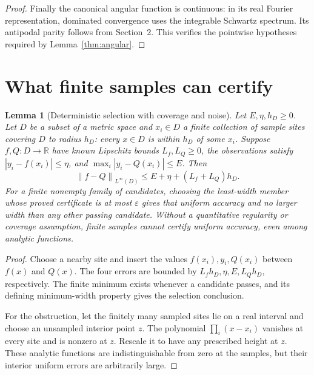 \documentclass[11pt,letterpaper]{article}
\newcommand{\R}{\mathbb R}
\newcommand{\eps}{\varepsilon}
\newcommand{\norm}[1]{\left\lVert#1\right\rVert}
\newtheorem{lemma}{Lemma}[section]
\theoremstyle{definition}
\theoremstyle{remark}
\begin{document}
\begin{proof}
Finally the canonical angular function is continuous: in its real Fourier
representation, dominated convergence uses the integrable Schwartz spectrum.
Its antipodal parity follows from Section~2. This verifies the pointwise
hypotheses required by Lemma~\ref{thm:angular}.
\end{proof}

\section{What finite samples can certify}
\begin{lemma}[Deterministic selection with coverage and noise]\label{thm:data}
Let \(E,\eta,h_D\ge0\). Let \(D\) be a subset of a metric space and
\(x_i\in D\) a finite collection of sample sites covering
\(D\) to radius \(h_D\): every \(x\in D\) is within \(h_D\) of some \(x_i\).
Suppose \(f,Q:D\to\R\) have known Lipschitz bounds \(L_f,L_Q\ge0\),
the observations satisfy \(|y_i-f(x_i)|\le\eta\), and
\(\max_i|y_i-Q(x_i)|\le E\).
Then
\[
 \norm{f-Q}_{L^\infty(D)}
       \le E+\eta+(L_f+L_Q)h_D.
\]
For a finite nonempty family of candidates, choosing the least-width member
whose proved certificate is at most \(\eps\) gives that uniform accuracy and
no larger width than any other passing candidate.
Without a quantitative regularity or coverage assumption, finite samples
cannot certify uniform accuracy, even among analytic functions.
\end{lemma}
\begin{proof}
Choose a nearby site and insert the values \(f(x_i),y_i,Q(x_i)\) between
\(f(x)\) and \(Q(x)\). The four errors are bounded by
\(L_fh_D,\eta,E,L_Qh_D\), respectively.
The finite minimum exists whenever a candidate passes, and its defining
minimum-width property gives the selection conclusion.

For the obstruction, let the finitely many sampled sites lie on a real
interval and choose an unsampled interior point \(z\).
The polynomial \(\prod_i(x-x_i)\) vanishes at every site and is nonzero at \(z\).
Rescale it to have any prescribed height at \(z\).
These analytic functions are indistinguishable from zero at the samples,
but their interior uniform errors are arbitrarily large.
\end{proof}
\end{document}
